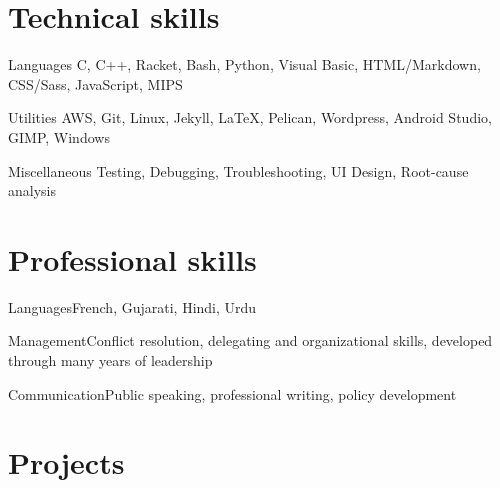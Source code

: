 \documentclass[fontsize=10pt]{tccv}
\begin{document}
\section{Technical skills}

\begin{factlist}

\item{Languages}
     {C, C++, Racket, Bash, Python, Visual Basic, HTML/Markdown, CSS/Sass, JavaScript,  MIPS}

\item{Utilities}
     {AWS, Git, Linux, Jekyll, \LaTeX, Pelican, Wordpress, Android Studio, GIMP, Windows}

\item{Miscellaneous}
    {Testing, Debugging, Troubleshooting, UI Design, Root-cause analysis}

\end{factlist}

\section{Professional skills}

\begin{factlist}
\item{Languages}{French, Gujarati, Hindi, Urdu}
\item{Management}{Conflict resolution, delegating and organizational skills,
    developed through many years of leadership}
\item{Communication}{Public speaking, professional writing, policy development}
\end{factlist}

\section{Projects}
\end{document}
